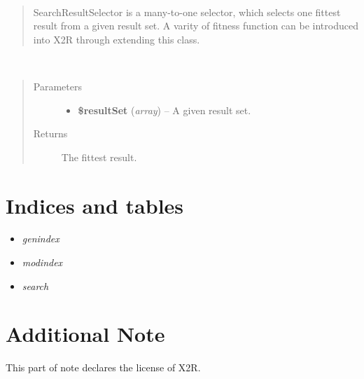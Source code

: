 \documentclass[letterpaper,10pt,english]{sphinxmanual}
\begin{document}
\begin{fulllineitems}
\label{docs/api:SearchResultSelector}~\begin{quote}

SearchResultSelector is a many-to-one selector, which selects one fittest result from a given result set. A varity of fitness function can be introduced into X2R through extending this class.
\end{quote}

\begin{fulllineitems}
\label{docs/api:SearchResultSelector::select}~\begin{quote}\begin{description}
\item[{Parameters}] \leavevmode\begin{itemize}
\item {} 
\textbf{\$resultSet} (\emph{array}) -- A given result set.

\end{itemize}

\item[{Returns}] \leavevmode
The fittest result.

\end{description}\end{quote}

\end{fulllineitems}


\end{fulllineitems}



\chapter{Indices and tables}
\label{index:indices-and-tables}\begin{itemize}
\item {} 
\emph{genindex}

\item {} 
\emph{modindex}

\item {} 
\emph{search}

\end{itemize}


\chapter{Additional Note}
\label{index:additional-note}
This part of note declares the license of X2R.
\end{document}
